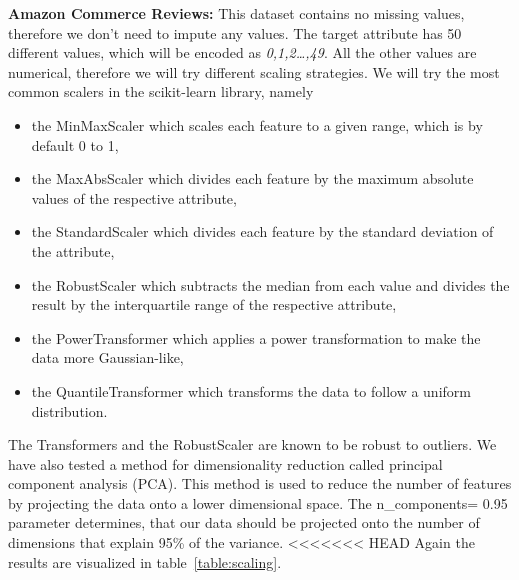 \documentclass[a4paper,10pt]{article}
\begin{document}
\textbf{Amazon Commerce Reviews:} This dataset contains no missing values, therefore we don't need to impute any values.
The target attribute has 50 different values, which will be encoded as \textit{0,1,2\ldots,49}. 
All the other values are numerical, therefore we will try different scaling strategies.
We will try the most common scalers in the scikit-learn library, namely 
\begin{itemize}
    \item the MinMaxScaler which scales each feature to a given range, which is by default 0 to 1,
    \item the MaxAbsScaler which divides each feature by the maximum absolute values of the respective attribute,
    \item the StandardScaler which divides each feature by the standard deviation of the attribute,
    \item the RobustScaler which subtracts the median from each value and divides the result by the interquartile range of the respective attribute,
    \item the PowerTransformer which applies a power transformation to make the data more Gaussian-like,
    \item the QuantileTransformer which transforms the data to follow a uniform distribution.
\end{itemize}
The Transformers and the RobustScaler are known to be robust to outliers. We have also tested a method for dimensionality reduction called
principal component analysis (PCA). This method is used to reduce the number of features by projecting the data onto a lower dimensional space. 
The n\_components= 0.95 parameter determines, that our data should be projected onto the number of dimensions that explain 95\% of the variance.
<<<<<<< HEAD
Again the results are visualized in table~\ref{table:scaling}.
\end{document}
